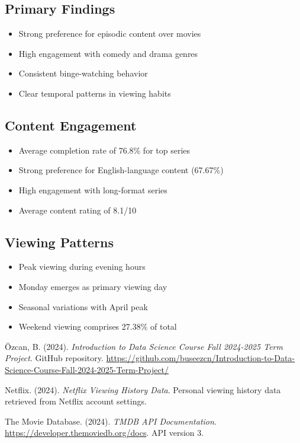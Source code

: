 \documentclass[12pt]{article}
\begin{document}
\subsection{Primary Findings}
\begin{itemize}
    \item Strong preference for episodic content over movies
    \item High engagement with comedy and drama genres
    \item Consistent binge-watching behavior
    \item Clear temporal patterns in viewing habits
\end{itemize}

\subsection{Content Engagement}
\begin{itemize}
    \item Average completion rate of 76.8\% for top series
    \item Strong preference for English-language content (67.67\%)
    \item High engagement with long-format series
    \item Average content rating of 8.1/10
\end{itemize}

\subsection{Viewing Patterns}
\begin{itemize}
    \item Peak viewing during evening hours
    \item Monday emerges as primary viewing day
    \item Seasonal variations with April peak
    \item Weekend viewing comprises 27.38\% of total
\end{itemize}

\begin{thebibliography}{9}

Özcan, B. (2024). 
\textit{Introduction to Data Science Course Fall 2024-2025 Term Project}. 
GitHub repository.
\url{https://github.com/buseezcn/Introduction-to-Data-Science-Course-Fall-2024-2025-Term-Project/}

Netflix. (2024). 
\textit{Netflix Viewing History Data}.
Personal viewing history data retrieved from Netflix account settings.

The Movie Database. (2024).
\textit{TMDB API Documentation}.
\url{https://developer.themoviedb.org/docs}. 
API version 3.

\end{thebibliography}
\end{document}
